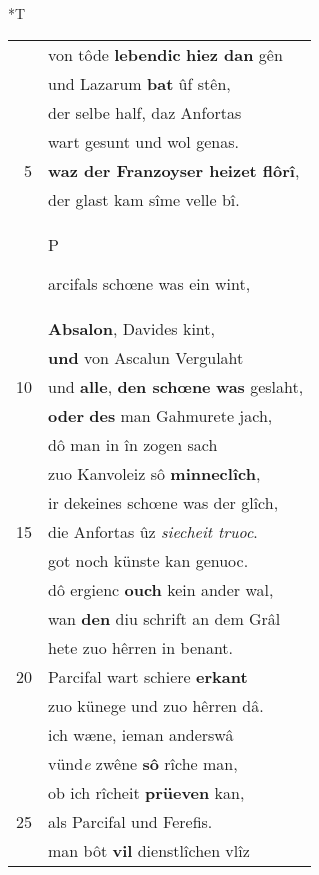 \documentclass[8pt,a4paper,notitlepage]{article}
\begin{document}
\begin{table}[ht]
\begin{minipage}[t]{0.5\linewidth}
\end{minipage}
\hspace{0.5cm}
\begin{minipage}[t]{0.5\linewidth}
\small
\begin{center}*T
\end{center}
\begin{tabular}{rl}
 & von tôde \textbf{lebendic} \textbf{hiez dan} gên\\ 
 & und Lazarum \textbf{bat} ûf stên,\\ 
 & der selbe half, daz Anfortas\\ 
 & wart gesunt und wol genas.\\ 
5 & \textbf{waz der Franzoyser heizet flôrî},\\ 
 & der glast kam sîme velle bî.\\ 
 & \begin{large}P\end{large}arcifals schœne was ein wint,\\ 
 & \textbf{Absalon}, Davides kint,\\ 
 & \textbf{und} von Ascalun Vergulaht\\ 
10 & und \textbf{alle}, \textbf{den schœne} \textbf{was} geslaht,\\ 
 & \textbf{oder} \textbf{des} man Gahmurete jach,\\ 
 & dô man in în zogen sach\\ 
 & zuo Kanvoleiz sô \textbf{minneclîch},\\ 
 & ir dekeines schœne was der glîch,\\ 
15 & die Anfortas ûz \textit{siecheit truoc}.\\ 
 & got noch künste kan genuoc.\\ 
 & dô ergienc \textbf{ouch} kein ander wal,\\ 
 & wan \textbf{den} diu schrift an dem Grâl\\ 
 & hete zuo hêrren in benant.\\ 
20 & Parcifal wart schiere \textbf{erkant}\\ 
 & zuo künege und zuo hêrren dâ.\\ 
 & ich wæne, ieman anderswâ\\ 
 & vünd\textit{e} zwêne \textbf{sô} rîche man,\\ 
 & ob ich rîcheit \textbf{prüeven} kan,\\ 
25 & als Parcifal und Ferefis.\\ 
 & man bôt \textbf{vil} dienstlîchen vlîz\\ 

\end{tabular}
\end{minipage}
\end{table}
\end{document}
